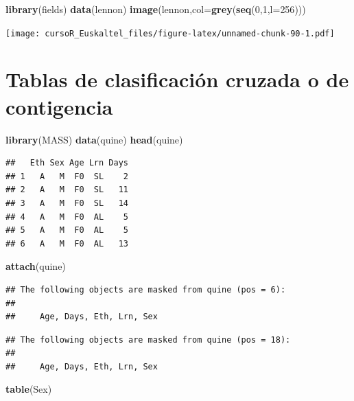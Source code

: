 \documentclass[]{book}
\newenvironment{Shaded}{\begin{snugshade}}{\end{snugshade}}
\newcommand{\KeywordTok}[1]{\textcolor[rgb]{0.13,0.29,0.53}{\textbf{#1}}}
\newcommand{\DataTypeTok}[1]{\textcolor[rgb]{0.13,0.29,0.53}{#1}}
\newcommand{\DecValTok}[1]{\textcolor[rgb]{0.00,0.00,0.81}{#1}}
\newcommand{\NormalTok}[1]{#1}
\begin{document}
\begin{Shaded}
\begin{Highlighting}[]
\KeywordTok{library}\NormalTok{(fields)}
\KeywordTok{data}\NormalTok{(lennon)}
\KeywordTok{image}\NormalTok{(lennon,}\DataTypeTok{col=}\KeywordTok{grey}\NormalTok{(}\KeywordTok{seq}\NormalTok{(}\DecValTok{0}\NormalTok{,}\DecValTok{1}\NormalTok{,}\DataTypeTok{l=}\DecValTok{256}\NormalTok{)))}
\end{Highlighting}
\end{Shaded}

\texttt{[image: cursoR\_Euskaltel\_files/figure-latex/unnamed-chunk-90-1.pdf]}

\section{Tablas de clasificación cruzada o de
contigencia}\label{tablas-de-clasificacion-cruzada-o-de-contigencia}

\begin{Shaded}
\begin{Highlighting}[]
\KeywordTok{library}\NormalTok{(MASS)}
\KeywordTok{data}\NormalTok{(quine)}
\KeywordTok{head}\NormalTok{(quine)}
\end{Highlighting}
\end{Shaded}

\begin{verbatim}
##   Eth Sex Age Lrn Days
## 1   A   M  F0  SL    2
## 2   A   M  F0  SL   11
## 3   A   M  F0  SL   14
## 4   A   M  F0  AL    5
## 5   A   M  F0  AL    5
## 6   A   M  F0  AL   13
\end{verbatim}

\begin{Shaded}
\begin{Highlighting}[]
\KeywordTok{attach}\NormalTok{(quine)}
\end{Highlighting}
\end{Shaded}

\begin{verbatim}
## The following objects are masked from quine (pos = 6):
## 
##     Age, Days, Eth, Lrn, Sex
\end{verbatim}

\begin{verbatim}
## The following objects are masked from quine (pos = 18):
## 
##     Age, Days, Eth, Lrn, Sex
\end{verbatim}

\begin{Shaded}
\begin{Highlighting}[]
\KeywordTok{table}\NormalTok{(Sex)}
\end{Highlighting}
\end{Shaded}
\end{document}
